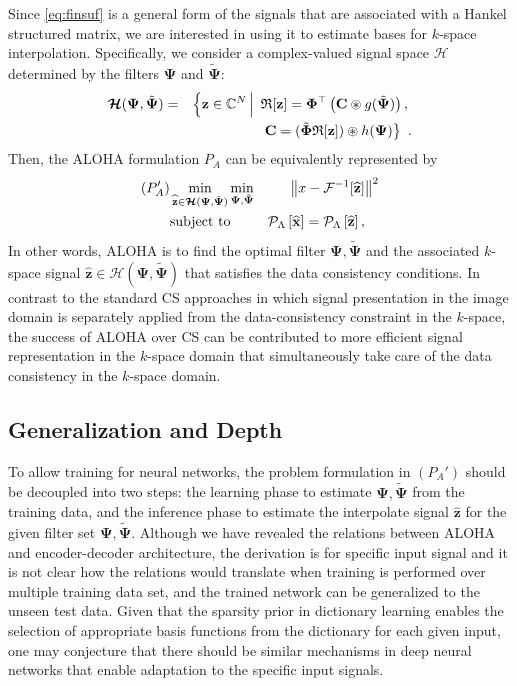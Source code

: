 \documentclass[10pt,journal]{IEEEtran}
\newcommand{\Cb}{{\mathbf{C}}}
\newcommand{\xb}{{\mathbf x}}
\newcommand{\zb}{{\mathbf z}}
\newcommand{\Phib}{{\boldsymbol {\Phi}}}
\newcommand{\Psib}{{\boldsymbol {\Psi}}}
\newcommand{\Cd}{{\mathbb C}}
\newcommand{\0}{{\boldsymbol{0}}}
\newcommand{\Hbc}{{\boldsymbol{\mathcal H}}}
\newcommand{\Rbc}{{\mathfrak{R}}}
\newcommand{\Fc}{{\mathcal F}}
\newcommand{\Pc}{{\mathcal P}}
\begin{document}
 




Since
\eqref{eq:finsuf} is a general form of the signals that are associated with a Hankel structured matrix,
 we are interested in using it to  estimate bases for $k$-space interpolation.
 Specifically, we consider a complex-valued signal space $\Hbc$ determined by the filters $\Psib$ and $\tilde \Psib$: \begin{eqnarray}\label{eq:H0}
\Hbc{(\Psib,\tilde\Psib)} &=& \left\{  \zb  \in \Cd^{N} \,\Big|\,\  \Rbc[ \zb ]=  \Phib^\top \left(\Cb \circledast g(\tilde \Psib)\right), \right. \notag \\
&& \left.  \Cb = (\tilde\Phib  \Rbc[ \zb]) \circledast   h(\Psib) \right\} \  . \end{eqnarray}
Then, the ALOHA formulation $P_A$ can be equivalently represented by
\begin{eqnarray}
(P_A') & \min\limits_{ \widehat\zb  \in \Hbc(\Psib,\tilde\Psib)}\min\limits_{ \Psib,\tilde\Psib}  &\left\|x- \Fc^{-1}[ \widehat\zb ]\right\|^2 \notag  \\
&\mbox{subject to } &
 \Pc_\Lambda \left[\widehat\xb\right]= \Pc_\Lambda \left[\widehat \zb \right],\quad  \notag
\end{eqnarray}
In other words, ALOHA is  to find the optimal filter $\Psib,\tilde\Psib$ and the associated $k$-space
signal $\widehat\zb \in \Hbc(\Psib,\tilde\Psib)$  that satisfies the data consistency conditions.
In contrast to the standard CS approaches in which signal presentation in the image domain is separately applied
from the data-consistency constraint in  the $k$-space,
 the success of ALOHA over CS can be contributed to more efficient signal representation in the $k$-space domain
 that simultaneously take care of the data consistency in the $k$-space domain.

\subsection{Generalization and Depth}
 



To allow  training for neural networks, the problem formulation
in $(P_A')$  should be decoupled into two steps: the learning phase to estimate $\Psib,\tilde\Psib$
from the training data,  and the inference phase to estimate the
interpolate signal $\widehat \zb$ for the given filter set $\Psib,\tilde\Psib$.
Although we have revealed the relations between ALOHA  and encoder-decoder architecture, the derivation is for specific input signal and it is not clear how 
 the relations would translate when training is performed over multiple training data set,
and the trained network can be  generalized to the unseen test data.
Given that
the  sparsity prior in dictionary learning enables the selection of appropriate basis functions from the dictionary for each given
input, one may conjecture that
there should be similar mechanisms in deep neural networks that enable adaptation  to the specific input signals.
\end{document}
